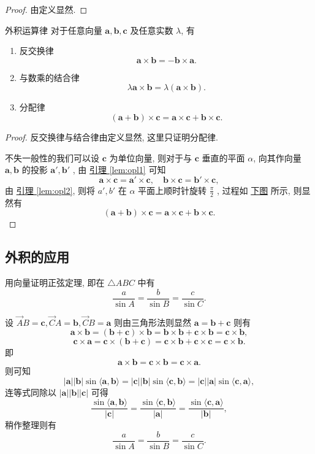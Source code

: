 \documentclass[cn,toc=twocol]{elegantbook}
\newcommand{\ITEMS}{\begin{enumerate}}
\newcommand{\ITEME}{\end{enumerate}}
\newcommand{\ve}[1]{\boldsymbol{#1}}
\newcommand{\Ve}[1]{\overrightarrow{#1}}
\newcommand{\vtimes}[2]{\ve{#1} \times \ve{#2}}
\newcommand{\FIGS}{
	\begin{figure}[H]
	\centering
}
\newcommand{\FIGE}{
	\end{figure}
}
\begin{document}
\begin{proof}
	由定义显然.
\end{proof}


\begin{theorem}{外积运算律} 
对于任意向量 $\ve a, \ve b, \ve c$ 及任意实数 $\lambda$, 有
\ITEMS
	\item 反交换律
	\[
		\vtimes{a}{b} = -\ve b \times \ve a.
	\]
	\item 与数乘的结合律
	\[
		\lambda \vtimes{a}{b} = \lambda (\vtimes{a}{b}).
	\]
	\item 分配律
	\[
		(\ve a + \ve b) \times \ve c = \ve a \times \ve c + \ve b \times \ve c.
	\]
\ITEME
\end{theorem}

\begin{proof}
反交换律与结合律由定义显然, 这里只证明分配律.

不失一般性的我们可以设 $\ve c$ 为单位向量, 则对于与 $\ve c$ 垂直的平面 $\alpha$, 向其作向量 $\ve a, \ve b$ 的投影 $\ve a', \ve b'$ , 由 \hyperref[lem:opl1]{引理 \ref{lem:opl1}} 可知
\[
	\ve a \times \ve c = \ve a' \times \ve c, \quad \ve b \times \ve c = \ve b' \times \ve c,
\]
由 \hyperref[lem:opl2]{引理 \ref{lem:opl2}}, 则将 $a', b'$ 在 $\alpha$ 平面上顺时针旋转 $\frac{\pi}{2}$ , 过程如 \hyperref[fig:ope1]{下图} 所示, 则显然有
\[
	(\ve a + \ve b) \times \ve c = \ve a \times \ve c + \ve b \times \ve c.
\] 
\end{proof}
\bigskip

\FIGS
%
\caption{}
\label{fig:ope1}
\FIGE

\subsection{外积的应用}

\begin{example}
用向量证明正弦定理, 即在 $\triangle ABC$ 中有
	\[
		\frac{a}{\sin A} = \frac{b}{\sin B} = \frac{c}{\sin C}.
	\]
\end{example}

\begin{solution}
	设 $\Ve AB = \ve c, \Ve CA = \ve b, \Ve CB = \ve a$ 则由三角形法则显然 $\ve a = \ve b + \ve c$ 则有
	\[
		\vtimes{a}{b} = (\ve b + \ve c) \times \ve b = \ve b \times \ve b + \ve c \times \ve b = \ve c \times \ve b,
	\]
	\[
		\ve c \times \ve a = \ve c \times (\ve b + \ve c) = \ve c \times \ve b + \ve c \times \ve c = \ve c \times \ve b.
	\]
	即
	\[
		\vtimes{a}{b} = \ve c \times \ve b = \ve c \times \ve a.
	\]
	则可知
	\[
		\lvert \ve a \rvert \lvert \ve b \rvert \sin \langle \ve a, \ve b \rangle = \lvert \ve c \rvert \lvert \ve b \rvert \sin \langle \ve c, \ve b \rangle = \lvert \ve c \rvert \lvert \ve a \rvert \sin \langle \ve c, \ve a \rangle,
	\]
	连等式同除以 $\lvert \ve a \rvert \lvert \ve b \rvert \lvert \ve c \rvert$ 可得
	\[
		 \frac{\sin \langle \ve a, \ve b \rangle}{\lvert \ve c \rvert} = \frac{\sin \langle \ve c, \ve b \rangle}{\lvert \ve a \rvert} = \frac{\sin \langle \ve c, \ve a \rangle}{\lvert \ve b \rvert},
	\]
	稍作整理则有
	\[
		\frac{a}{\sin A} = \frac{b}{\sin B} = \frac{c}{\sin C}.
	\]
\end{solution}
\bigskip
\end{document}
